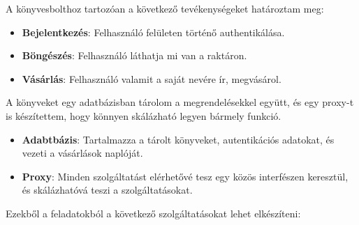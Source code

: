 \documentclass[11pt,magyar,a4paper,twoside,]{report}
\providecommand{\tightlist}{%
  \setlength{\itemsep}{0pt}\setlength{\parskip}{0pt}}
\begin{document}
A könyvesbolthoz tartozóan a következő tevékenységeket határoztam meg:

\begin{itemize}
\tightlist
\item
  \textbf{Bejelentkezés}: Felhasználó felületen történő authentikálása.
\item
  \textbf{Böngészés}: Felhasználó láthatja mi van a raktáron.
\item
  \textbf{Vásárlás}: Felhasználó valamit a saját nevére ír, megvásárol.
\end{itemize}

A könyveket egy adatbázisban tárolom a megrendelésekkel együtt, és egy
proxy-t is készítettem, hogy könnyen skálázható legyen bármely funkció.

\begin{itemize}
\tightlist
\item
  \textbf{Adabtbázis}: Tartalmazza a tárolt könyveket, autentikációs
  adatokat, és vezeti a vásárlások naplóját.
\item
  \textbf{Proxy}: Minden szolgáltatást elérhetővé tesz egy közös
  interfészen keresztül, és skálázhatóvá teszi a szolgáltatásokat.
\end{itemize}

Ezekből a feladatokból a következő szolgáltatásokat lehet elkészíteni:
\end{document}
